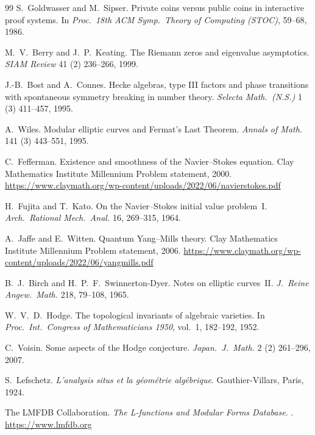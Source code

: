 \documentclass[11pt,a4paper]{amsart}
\theoremstyle{plain}
\theoremstyle{definition}
\begin{document}
\begin{thebibliography}{99}
S.~Goldwasser and M.~Sipser.
\newblock Private coins versus public coins in interactive proof systems.
\newblock In \emph{Proc.\ 18th ACM Symp.\ Theory of Computing (STOC)}, 59--68, 1986.

M.~V.~Berry and J.~P.~Keating.
\newblock The Riemann zeros and eigenvalue asymptotics.
\newblock \emph{SIAM Review} 41 (2) 236--266, 1999.

J.-B.~Bost and A.~Connes.
\newblock Hecke algebras, type III factors and phase transitions with spontaneous symmetry breaking in number theory.
\newblock \emph{Selecta Math.\ (N.S.)} 1 (3) 411--457, 1995.

A.~Wiles.
\newblock Modular elliptic curves and Fermat's Last Theorem.
\newblock \emph{Annals of Math.} 141 (3) 443--551, 1995.

C.~Fefferman.
\newblock Existence and smoothness of the Navier--Stokes equation.
\newblock Clay Mathematics Institute Millennium Problem statement, 2000.
\newblock \url{https://www.claymath.org/wp-content/uploads/2022/06/navierstokes.pdf}

H.~Fujita and T.~Kato.
\newblock On the Navier--Stokes initial value problem~I.
\newblock \emph{Arch.\ Rational Mech.\ Anal.} 16, 269--315, 1964.

A.~Jaffe and E.~Witten.
\newblock Quantum Yang--Mills theory.
\newblock Clay Mathematics Institute Millennium Problem statement, 2006.
\newblock \url{https://www.claymath.org/wp-content/uploads/2022/06/yangmills.pdf}

B.~J.~Birch and H.~P.~F.~Swinnerton-Dyer.
\newblock Notes on elliptic curves~II.
\newblock \emph{J.\ Reine Angew.\ Math.} 218, 79--108, 1965.

W.~V.~D.~Hodge.
\newblock The topological invariants of algebraic varieties.
\newblock In \emph{Proc.\ Int.\ Congress of Mathematicians 1950}, vol.~1, 182--192, 1952.

C.~Voisin.
\newblock Some aspects of the Hodge conjecture.
\newblock \emph{Japan.\ J.\ Math.} 2 (2) 261--296, 2007.

S.~Lefschetz.
\newblock \emph{L'analysis situs et la g\'eom\'etrie alg\'ebrique}.
\newblock Gauthier-Villars, Paris, 1924.

The LMFDB Collaboration.
\newblock \emph{The L-functions and Modular Forms Database}.
. \url{https://www.lmfdb.org}


\end{thebibliography}
\end{document}
